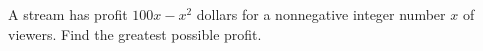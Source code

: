 A stream has profit $100x-x^2$ dollars for a nonnegative integer number $x$ of viewers. Find the greatest possible profit.
